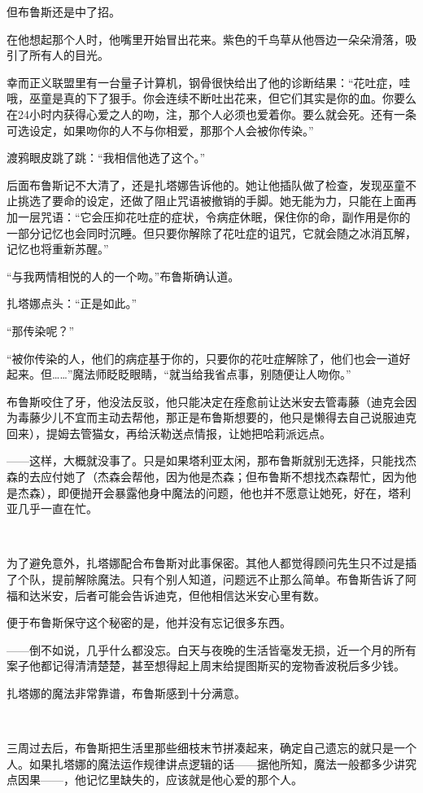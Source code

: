 \documentclass[../main.tex]{subfiles}
\begin{document}
但布鲁斯还是中了招。

在他想起那个人时，他嘴里开始冒出花来。紫色的千鸟草从他唇边一朵朵滑落，吸引了所有人的目光。

幸而正义联盟里有一台量子计算机，钢骨很快给出了他的诊断结果：“花吐症，哇哦，巫童是真的下了狠手。你会连续不断吐出花来，但它们其实是你的血。你要么在24小时内获得心爱之人的吻，注，那个人必须也爱着你。要么就会死。还有一条可选设定，如果吻你的人不与你相爱，那那个人会被你传染。”

渡鸦眼皮跳了跳：“我相信他选了这个。”

后面布鲁斯记不大清了，还是扎塔娜告诉他的。她让他插队做了检查，发现巫童不止挑选了要命的设定，还做了阻止咒语被撤销的手脚。她无能为力，只能在上面再加一层咒语：“它会压抑花吐症的症状，令病症休眠，保住你的命，副作用是你的一部分记忆也会同时沉睡。但只要你解除了花吐症的诅咒，它就会随之冰消瓦解，记忆也将重新苏醒。”

“与我两情相悦的人的一个吻。”布鲁斯确认道。

扎塔娜点头：“正是如此。”

“那传染呢？”

“被你传染的人，他们的病症基于你的，只要你的花吐症解除了，他们也会一道好起来。但……”魔法师眨眨眼睛，“就当给我省点事，别随便让人吻你。”

布鲁斯咬住了牙，他没法反驳，他只能决定在痊愈前让达米安去管毒藤（迪克会因为毒藤少儿不宜而主动去帮他，那正是布鲁斯想要的，他只是懒得去自己说服迪克回来），提姆去管猫女，再给沃勒送点情报，让她把哈莉派远点。

——这样，大概就没事了。只是如果塔利亚太闲，那布鲁斯就别无选择，只能找杰森的去应付她了（杰森会帮他，因为他是杰森；但布鲁斯不想找杰森帮忙，因为他是杰森），即便抛开会暴露他身中魔法的问题，他也并不愿意让她死，好在，塔利亚几乎一直在忙。

~\

为了避免意外，扎塔娜配合布鲁斯对此事保密。其他人都觉得顾问先生只不过是插了个队，提前解除魔法。只有个别人知道，问题远不止那么简单。布鲁斯告诉了阿福和达米安，后者可能会告诉迪克，但他相信达米安心里有数。

便于布鲁斯保守这个秘密的是，他并没有忘记很多东西。

——倒不如说，几乎什么都没忘。白天与夜晚的生活皆毫发无损，近一个月的所有案子他都记得清清楚楚，甚至想得起上周末给提图斯买的宠物香波税后多少钱。

扎塔娜的魔法非常靠谱，布鲁斯感到十分满意。

~\

三周过去后，布鲁斯把生活里那些细枝末节拼凑起来，确定自己遗忘的就只是一个人。如果扎塔娜的魔法运作规律讲点逻辑的话——据他所知，魔法一般都多少讲究点因果——，他记忆里缺失的，应该就是他心爱的那个人。
\end{document}

